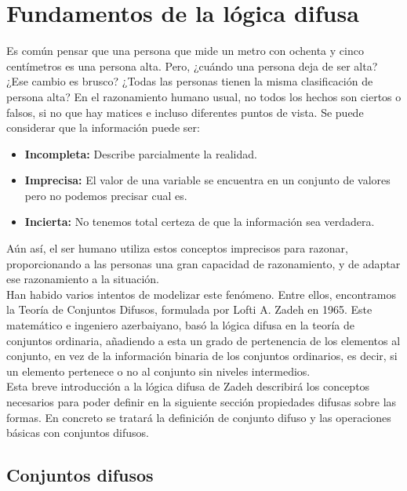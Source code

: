 \section{Fundamentos de la lógica difusa}

Es común pensar que una persona que mide un metro con ochenta y cinco centímetros es una persona alta. Pero, ¿cuándo una persona deja de ser alta? ¿Ese cambio es brusco? ¿Todas las personas tienen la misma clasificación de persona alta? En el razonamiento humano usual, no todos los hechos son ciertos o falsos, si no que hay matices e incluso diferentes puntos de vista. Se puede considerar que la información puede ser:

\begin{itemize}
\item \textbf{Incompleta:} Describe parcialmente la realidad.
\item \textbf{Imprecisa:} El valor de una variable se encuentra en un conjunto de valores pero no podemos precisar cual es.
\item \textbf{Incierta:} No tenemos total certeza de que la información sea verdadera.
\end{itemize}

Aún así, el ser humano utiliza estos conceptos imprecisos para razonar, proporcionando a las personas una gran capacidad de razonamiento, y de adaptar ese razonamiento a la situación.\\

Han habido varios intentos de modelizar este fenómeno. Entre ellos, encontramos la Teoría de Conjuntos Difusos, formulada por Lofti A. Zadeh en 1965\cite{Zadeh-Fuzzy-1965}. Este matemático e ingeniero azerbaiyano, basó la lógica difusa en la teoría de conjuntos ordinaria, añadiendo a esta un grado de pertenencia de los elementos al conjunto, en vez de la información binaria de los conjuntos ordinarios, es decir, si un elemento pertenece o no al conjunto sin niveles intermedios.\\

Esta breve introducción a la lógica difusa de Zadeh describirá los conceptos necesarios para poder definir en la siguiente sección propiedades difusas sobre las formas. En concreto se tratará la definición de conjunto difuso y las operaciones básicas con conjuntos difusos.\\

\subsection{Conjuntos difusos}

